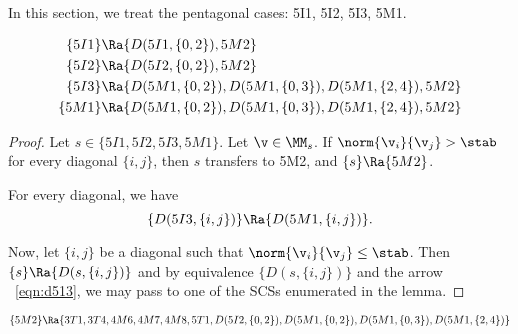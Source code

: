 
In this section, we treat the pentagonal cases: 5I1, 5I2, 5I3, 5M1.

\begin{lemma}[]
\begin{align*}
\{5I1\}&\Ra \{D(5I1,\{0,2\}),5M2\}\\
\{5I2\}&\Ra \{D(5I2,\{0,2\}),5M2\}\\
\{5I3\}&\Ra \{D(5M1,\{0,2\}),D(5M1,\{0,3\}),D(5M1,\{2,4\}),5M2\}\\
\{5M1\}&\Ra \{D(5M1,\{0,2\}),D(5M1,\{0,3\}),D(5M1,\{2,4\}),5M2\}\\
\end{align*}
\end{lemma}

\begin{proof}
Let  $s\in \{5I1,5I2,5I3,5M1\}$.
Let $\v\in\MM_s$.  If $\norm{\v_i}{\v_j}>\stab$ for every diagonal $\{i,j\}$, then $s$ transfers to 5M2,
and $\{s\}\Ra \{5M2\}$.

For every diagonal,
we have 
\begin{equation}\label{eqn:d513}
\{D(5I3,\{i,j\})\}\Ra \{D(5M1,\{i,j\})\}.
\end{equation}

Now, let $\{i,j\}$ be a diagonal such that $\norm{\v_i}{\v_j}\le \stab$.  
Then $\{s\}\Ra \{D(s,\{i,j\})\}$ and by equivalence $\{D(s,\{i,j\})\}$ and the arrow ~\eqref{eqn:d513},
we may pass to one of the SCSs enumerated in the lemma.
\end{proof}

\begin{lemma}[]
\[
\{5M2\}\Ra \{3T1,3T4,4M6,4M7,4M8,5T1,D(5I2,\{0,2\}),D(5M1,\{0,2\}),D(5M1,\{0,3\}),D(5M1,\{2,4\}) \}
\]
\end{lemma}

